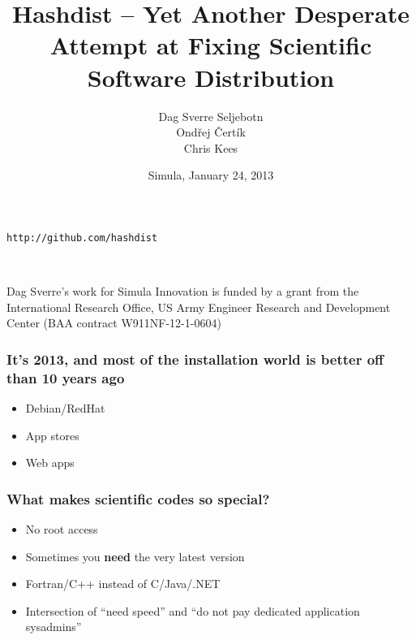 \documentclass[sans,mathserif]{beamer}
\title{Hashdist -- Yet Another Desperate Attempt at Fixing Scientific Software Distribution}
\author{Dag Sverre Seljebotn\\Ond\v{r}ej \v{C}ert\'{i}k\\Chris Kees}
\date{Simula, January 24, 2013}
\begin{document}
\begin{frame}
  \titlepage

  \begin{center} {\tt http://github.com/hashdist}
  \end{center}
~

{\footnotesize

Dag Sverre's work for Simula Innovation is funded by a grant from the \\
International Research Office, US Army Engineer Research and Development Center
(BAA contract W911NF-12-1-0604)
}

\end{frame}


\begin{frame}
  \frametitle{It's 2013, and most of the installation world is better off than 10 years ago}

  \begin{itemize}
    \item<+-> Debian/RedHat
    \item<+-> App stores
    \item<+-> Web apps
  \end{itemize}
\end{frame}

\begin{frame}[fragile]
  \frametitle{What makes scientific codes so special?}

  \begin{itemize}
    \item<+-> No root access
    \item<+-> Sometimes you {\bf need} the very latest version
    \item<+-> Fortran/C++ instead of C/Java/.NET
    \item<+-> Intersection of ``need speed'' and ``do not pay dedicated application sysadmins''
  \end{itemize}
\end{frame}
\end{document}
